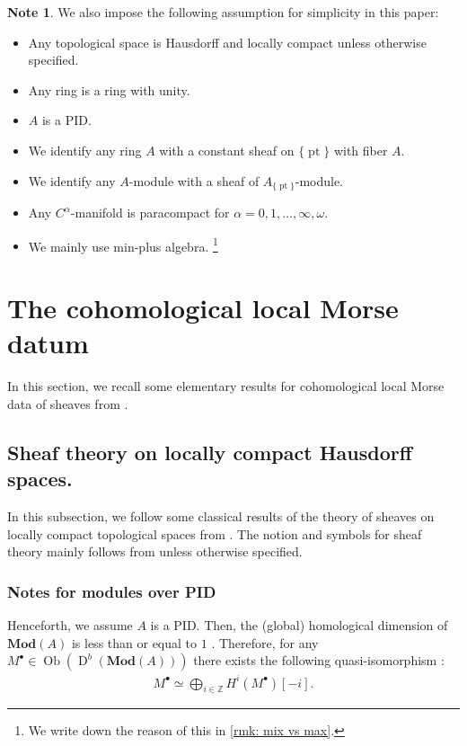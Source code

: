 \documentclass[a4paper,dvipdfmx,reqno,12pt]{amsart}
\theoremstyle{definition}
\newtheorem{Note}[theorem]{Note}
\newcommand{\Z}{\mathbb{Z}}%
\newcommand{\opn}[1]{\operatorname{#1}}
\newcommand{\catn}[1]{\mathbf{#1}}
\newcommand{\myfootnote}[1]{\hspace{-5pt}\footnote{#1}}
\numberwithin{equation}{section}
\begin{document}
\begin{Note}
We also impose the following assumption for simplicity in this paper:
\begin{itemize}
\setlength{\leftskip}{-20pt}
\item Any topological space is Hausdorff and
locally compact unless otherwise specified.
\item Any ring is a ring with unity.
\item $A$ is a PID.
\item We identify any ring $A$ with a constant sheaf on
$\{\opn{pt}\}$ with fiber $A$.
\item We identify any $A$-module with a sheaf of 
$A_{\{\opn{pt}\}}$-module.
\item Any $C^{\alpha}$-manifold is paracompact for 
$\alpha=0,1,\ldots,\infty,\omega$.
\item We mainly use min-plus algebra.
\myfootnote{We write down the reason of this in 
\cref{rmk: mix vs max}.}
\end{itemize}



\end{Note}

\section{The cohomological local Morse datum}
In this section, we recall some elementary results
for cohomological local Morse data of sheaves from
\cite{MR2031639,MR1299726}.



\subsection{Sheaf theory on locally compact 
Hausdorff spaces.}
In this subsection, we follow some classical results of
the theory of sheaves on locally compact topological
spaces from \cite{iversenCohomologySheaves1986a,
MR1299726,MR1269324,MR2050072}.
The notion and symbols for 
sheaf theory mainly follows from \cite{MR1299726}
unless otherwise specified.

\subsubsection{Notes for modules over PID}

Henceforth, we assume $A$ is a PID. 
Then, the (global) homological dimension of 
$\catn{Mod}(A)$ is less than or equal to $1$
\cite[Exercise I.17, I.28]{MR1299726}.
Therefore, for any $M^{\bullet}\in \opn{Ob}(\opn{D}^{b}(\catn{Mod}(A)))$
there exists the following quasi-isomorphism 
\cite[Exercise I.18]{MR1299726}:
\begin{align}
M^{\bullet}\simeq 
\bigoplus_{i\in \Z}H^{i}(M^{\bullet})[-i].
\end{align}
\end{document}
